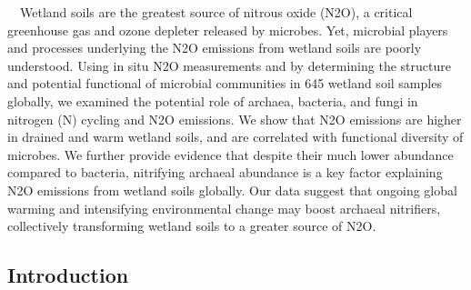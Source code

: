 \documentclass[
]{article}
\begin{document}
　Wetland soils are the greatest source of nitrous oxide (N2O), a
critical greenhouse gas and ozone depleter released by microbes. Yet,
microbial players and processes underlying the N2O emissions from
wetland soils are poorly understood. Using in situ N2O measurements and
by determining the structure and potential functional of microbial
communities in 645 wetland soil samples globally, we examined the
potential role of archaea, bacteria, and fungi in nitrogen (N) cycling
and N2O emissions. We show that N2O emissions are higher in drained and
warm wetland soils, and are correlated with functional diversity of
microbes. We further provide evidence that despite their much lower
abundance compared to bacteria, nitrifying archaeal abundance is a key
factor explaining N2O emissions from wetland soils globally. Our data
suggest that ongoing global warming and intensifying environmental
change may boost archaeal nitrifiers, collectively transforming wetland
soils to a greater source of N2O.

\hypertarget{introduction}{%
\subsection{Introduction}\label{introduction}}
\end{document}
